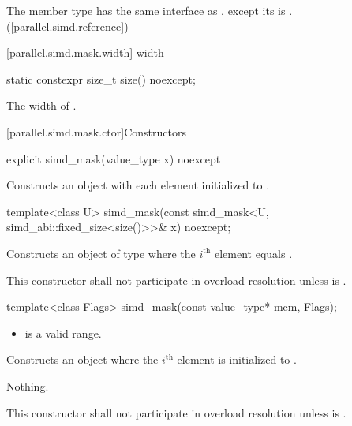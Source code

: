 \pnum
The member type  has the same interface as , except its  is . (\ref{parallel.simd.reference})

[parallel.simd.mask.width]{ width}

\begin{itemdecl}
static constexpr size_t size() noexcept;
\end{itemdecl}

\begin{itemdescr}
  \pnum\returns
  The width of .
\end{itemdescr}

[parallel.simd.mask.ctor]{Constructors}

\begin{itemdecl}
explicit simd_mask(value_type x) noexcept
\end{itemdecl}

\begin{itemdescr}
  \pnum\effects
  Constructs an object with each element initialized to .
\end{itemdescr}

\begin{itemdecl}
template<class U> simd_mask(const simd_mask<U, simd_abi::fixed_size<size()>>& x) noexcept;
\end{itemdecl}

\begin{itemdescr}
  \pnum\effects
  Constructs an object of type  where the $i^\text{th}$ element equals  \foralli.

  \pnum\remarks
  This constructor shall not participate in overload resolution unless  is .
\end{itemdescr}

\begin{itemdecl}
template<class Flags> simd_mask(const value_type* mem, Flags);
\end{itemdecl}

\begin{itemdescr}
  \pnum\requires
  \begin{itemize}
    \item \tcode{[mem, mem + size())} is a valid range.
  \end{itemize}

  \pnum\effects
  Constructs an object where the $i^\text{th}$ element is initialized to  \foralli.

  \pnum\throws Nothing.

  \pnum\remarks
  This constructor shall not participate in overload resolution unless  is .

\end{itemdescr}

